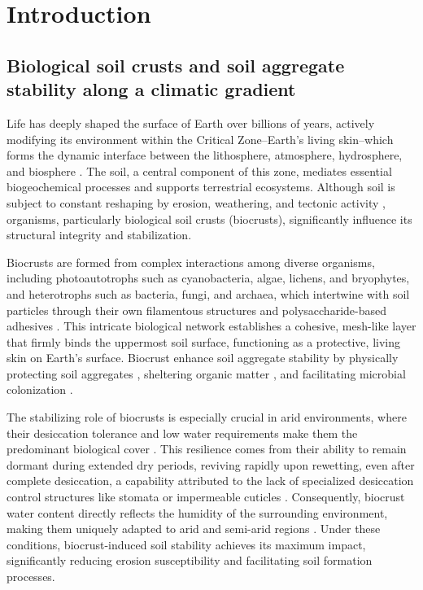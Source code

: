\chapter{Introduction}
\section{Biological soil crusts and soil aggregate stability along a climatic gradient}
\label{sec:BiocrustAndStabilityInCLimate}

Life has deeply shaped the surface of Earth over billions of years, actively modifying its environment within the Critical Zone--Earth's living skin--which forms the dynamic interface between the lithosphere, atmosphere, hydrosphere, and biosphere \citep{Amundson2007,Brantley2017,Dietrich2006}. The soil, a central component of this zone, mediates essential biogeochemical processes and supports terrestrial ecosystems. Although soil is subject to constant reshaping by erosion, weathering, and tectonic activity \citep{Scholten2017}, organisms, particularly biological soil crusts (biocrusts), significantly influence its structural integrity and stabilization.

Biocrusts are formed from complex interactions among diverse organisms, including photoautotrophs such as cyanobacteria, algae, lichens, and bryophytes, and heterotrophs such as bacteria, fungi, and archaea, which intertwine with soil particles through their own filamentous structures and polysaccharide-based adhesives \citep{Belnap2016,Gao2017,Weber2022,Xiao2022}. This intricate biological network establishes a cohesive, mesh-like layer that firmly binds the uppermost soil surface, functioning as a protective, living skin on Earth's surface. Biocrust enhance soil aggregate stability by physically protecting soil aggregates \citep{Szyja2023}, sheltering organic matter \citep{Drahorad2020}, and facilitating microbial colonization \citep{DelgadoBaquerizo2018}.

The stabilizing role of biocrusts is especially crucial in arid environments, where their desiccation tolerance and low water requirements make them the predominant biological cover \citep{Chen2020,Oliver2005}. This resilience comes from their ability to remain dormant during extended dry periods, reviving rapidly upon rewetting, even after complete desiccation, a capability attributed to the lack of specialized desiccation control structures like stomata or impermeable cuticles \citep{Maegdefrau1951,Proctor2007,Thielen2021}. Consequently, biocrust water content directly reflects the humidity of the surrounding environment, making them uniquely adapted to arid and semi-arid regions \citep{Colesie2016, Grote2010}. Under these conditions, biocrust-induced soil stability achieves its maximum impact, significantly reducing erosion susceptibility and facilitating soil formation processes.


